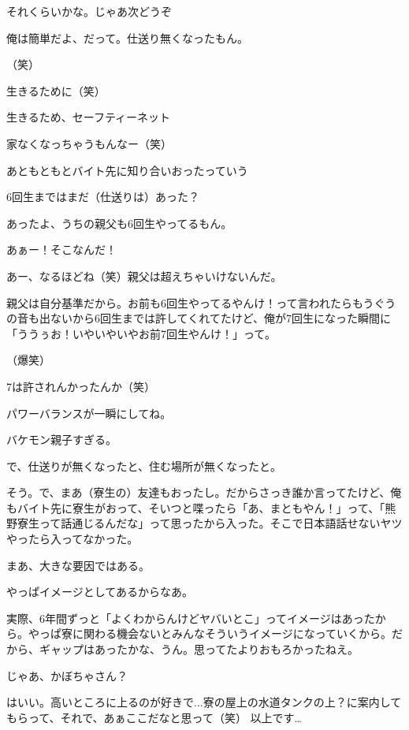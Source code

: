 \begin{multicols}{2}
  それくらいかな。じゃあ次どうぞ

  俺は簡単だよ、だって。仕送り無くなったもん。

  （笑）

  生きるために（笑）

  生きるため、セーフティーネット

  家なくなっちゃうもんなー（笑）

  あともともとバイト先に知り合いおったっていう

  6回生まではまだ（仕送りは）あった？

  あったよ、うちの親父も6回生やってるもん。

  あぁー！そこなんだ！

  あー、なるほどね（笑）親父は超えちゃいけないんだ。

  親父は自分基準だから。お前も6回生やってるやんけ！って言われたらもうぐうの音も出ないから6回生までは許してくれてたけど、俺が7回生になった瞬間に「ううぅお！いやいやいやお前7回生やんけ！」って。

  （爆笑）

  7は許されんかったんか（笑）

  パワーバランスが一瞬にしてね。

  バケモン親子すぎる。

  で、仕送りが無くなったと、住む場所が無くなったと。

  そう。で、まあ（寮生の）友達もおったし。だからさっき誰か言ってたけど、俺もバイト先に寮生がおって、そいつと喋ったら「あ、まともやん！」って、「熊野寮生って話通じるんだな」って思ったから入った。そこで日本語話せないヤツやったら入ってなかった。

  まあ、大きな要因ではある。

  やっぱイメージとしてあるからなあ。

  実際、6年間ずっと「よくわからんけどヤバいとこ」ってイメージはあったから。やっぱ寮に関わる機会ないとみんなそういうイメージになっていくから。だから、ギャップはあったかな、うん。思ってたよりおもろかったねえ。

  じゃあ、かぼちゃさん？

  はいい。高いところに上るのが好きで...寮の屋上の水道タンクの上？に案内してもらって、それで、あぁここだなと思って（笑） 以上です…


\end{multicols}
